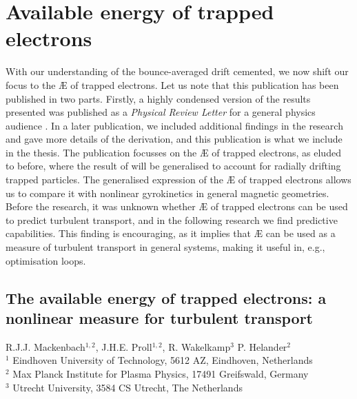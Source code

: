 \chapter[Available energy of trapped electrons]{Available energy of trapped electrons}
\label{chap: AE-TE}
With our understanding of the bounce-averaged drift cemented, we now shift our focus to the \AE{} of trapped electrons. Let us note that this publication has been published in two parts. Firstly, a highly condensed version of the results presented was published as a {\it Physical Review Letter} for a general physics audience \cite{mackenbach2022available}. In a later publication, we included additional findings in the research and gave more details of the derivation, and this publication is what we include in the thesis. The publication focusses on the \AE{} of trapped electrons, as eluded to before, where the result of \cite{helander2020available} will be generalised to account for radially drifting trapped particles. The generalised expression of the \AE{} of trapped electrons allows us to compare it with nonlinear gyrokinetics in general magnetic geometries. Before the research, it was unknown whether \AE{} of trapped electrons can be used to predict turbulent transport, and in the following research we find predictive capabilities. This finding is encouraging, as it implies that \AE{} can be used as a measure of turbulent transport in general systems, making it useful in, e.g., optimisation loops. \vfill \newpage

\section*{The available energy of trapped electrons: a nonlinear measure for turbulent transport}
\small{R.J.J. Mackenbach$^{1,2}$, J.H.E. Proll$^{1,2}$, R. Wakelkamp$^{3}$ P. Helander$^{2}$} \\
\small{$^1$ Eindhoven University of Technology, 5612 AZ, Eindhoven, Netherlands} \\
\small{$^2$ Max Planck Institute for Plasma Physics, 17491 Greifswald, Germany} \\
\small{$^3$ Utrecht University, 3584 CS Utrecht, The Netherlands}



